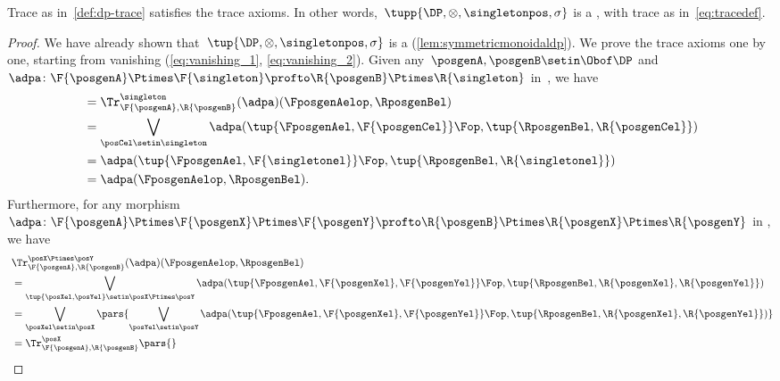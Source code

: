 {    \begin{lemma}\label{lem:dp-trace-is-trace}
        Trace as in~\cref{def:dp-trace} satisfies the trace axioms.
        In other words,~$\tupp{\DP, {{\otimes}}, \singletonpos, \sigma}$ is a , with trace as in~\cref{eq:tracedef}.
    \end{lemma}
    \begin{proof}
        We have already shown that~$\tup{\DP,{{\otimes}},\singletonpos,\sigma}$ is a  (\cref{lem:symmetricmonoidaldp}).
        We prove the trace axioms one by one, starting from vanishing (\cref{eq:vanishing_1}, \cref{eq:vanishing_2}).
        Given any~$\posgenA,\posgenB\setin \Obof\DP$ and~$\adpa\colon \F{\posgenA}\Ptimes \F{\singleton}\profto \R{\posgenB}\Ptimes \R{\singleton}$ in~\DP, we have
        \begin{equation}
            \begin{aligned}
                 & = \Tr_{\F{\posgenA},\R{\posgenB}}^{\singleton}(\adpa)(\FposgenAelop,\RposgenBel) \\
                 & =\bigvee_{\posCel\setin \singleton}\adpa(\tup{\FposgenAel,\F{\posgenCel}}\Fop, \tup{\RposgenBel,\R{\posgenCel}}) \\
                 & =\adpa(\tup{\FposgenAel,\F{\singletonel}}\Fop, \tup{\RposgenBel,\R{\singletonel}}) \\
                 & =\adpa(\FposgenAelop,\RposgenBel).
            \end{aligned}
        \end{equation}
        Furthermore, for any morphism~$\adpa\colon \F{\posgenA}\Ptimes \F{\posgenX}\Ptimes \F{\posgenY} \profto \R{\posgenB}\Ptimes \R{\posgenX} \Ptimes \R{\posgenY}$ in \DP, we have
        \begin{equation}
            \begin{aligned}
                ~ & \Tr_{\F{\posgenA},\R{\posgenB}}^{\posX\Ptimes\posY}(\adpa)(\FposgenAelop,\RposgenBel) \\
                  & = \bigvee_{\tup{\posXel,\posYel} \setin \posX\Ptimes \posY} \adpa(\tup{\FposgenAel,\F{\posgenXel},\F{\posgenYel}}\Fop, \tup{\RposgenBel,\R{\posgenXel},\R{\posgenYel}}) \\
                  & =\bigvee_{\posXel \setin \posX}\pars{\bigvee_{\posYel \setin \posY} \adpa(\tup{\FposgenAel,\F{\posgenXel},\F{\posgenYel}}\Fop, \tup{\RposgenBel,\R{\posgenXel},\R{\posgenYel}})} \\
                  & =\Tr_{\F{\posgenA},\R{\posgenB}}^\posX\pars{
}
\end{aligned}
\end{equation}
\end{proof}}

